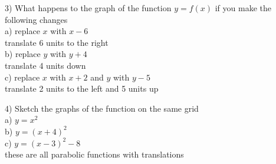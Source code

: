 \documentclass[10pt]{article}
\begin{document}
3) What happens to the graph of the function \(y = f(x)\) if you make the following changes \\
\hspace*{1em} a) replace \(x\) with \(x - 6\) \\
\hspace*{2em} translate 6 units to the right\\
\hspace*{1em} b) replace \(y\) with \(y + 4\) \\
\hspace*{2em} translate 4 units down\\
\hspace*{1em} c) replace \(x\) with \(x + 2\) and \(y\) with \(y-5\)\ \\
\hspace*{2em} translate 2 units to the left and 5 units up


4) Sketch the graphs of the function on the same grid \\
\hspace*{1em} a) \(y = x^2\) \\
\hspace*{1em} b) \(y = (x+4)^2\) \\
\hspace*{1em} c) \(y = (x-3)^2 - 8\) \\
\hspace*{2em} these are all parabolic functions with translations


\end{document}
